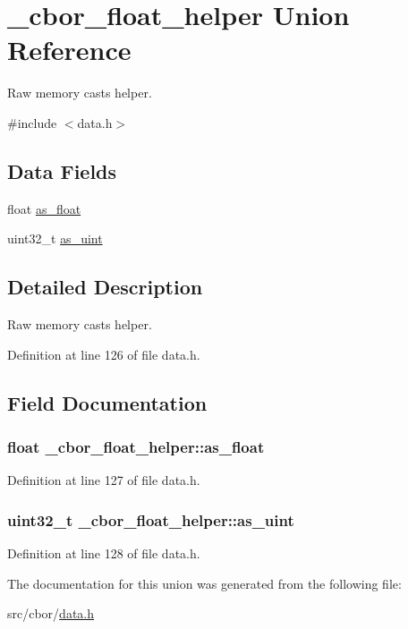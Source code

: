 \hypertarget{union__cbor__float__helper}{\section{\-\_\-cbor\-\_\-float\-\_\-helper Union Reference}
\label{union__cbor__float__helper}
}


Raw memory casts helper.  




{\ttfamily \#include $<$data.\-h$>$}

\subsection*{Data Fields}
\begin{DoxyCompactItemize}
\item 
float \hyperlink{union__cbor__float__helper_ae3a184f0f46ee8d87e6cb8e126e440a2}{as\-\_\-float}
\item 
uint32\-\_\-t \hyperlink{union__cbor__float__helper_a28a0047ea6592730009da39772638a76}{as\-\_\-uint}
\end{DoxyCompactItemize}


\subsection{Detailed Description}
Raw memory casts helper. 

Definition at line 126 of file data.\-h.



\subsection{Field Documentation}
\hypertarget{union__cbor__float__helper_ae3a184f0f46ee8d87e6cb8e126e440a2}{
\subsubsection[{as\-\_\-float}]{\setlength{\rightskip}{0pt plus 5cm}float \-\_\-cbor\-\_\-float\-\_\-helper\-::as\-\_\-float}}\label{union__cbor__float__helper_ae3a184f0f46ee8d87e6cb8e126e440a2}


Definition at line 127 of file data.\-h.

\hypertarget{union__cbor__float__helper_a28a0047ea6592730009da39772638a76}{
\subsubsection[{as\-\_\-uint}]{\setlength{\rightskip}{0pt plus 5cm}uint32\-\_\-t \-\_\-cbor\-\_\-float\-\_\-helper\-::as\-\_\-uint}}\label{union__cbor__float__helper_a28a0047ea6592730009da39772638a76}


Definition at line 128 of file data.\-h.



The documentation for this union was generated from the following file\-:\begin{DoxyCompactItemize}
\item 
src/cbor/\hyperlink{data_8h}{data.\-h}\end{DoxyCompactItemize}
